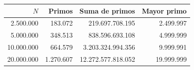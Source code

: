 \begin{tabular}{rrrr}
\toprule
$N$ & Primos & Suma de primos & Mayor primo \\
\midrule
2.500.000 & 183.072 & 219.697.708.195 & 2.499.997 \\
5.000.000 & 348.513 & 838.596.693.108 & 4.999.999 \\
10.000.000 & 664.579 & 3.203.324.994.356 & 9.999.991 \\
20.000.000 & 1.270.607 & 12.272.577.818.052 & 19.999.999 \\
\bottomrule
\end{tabular}